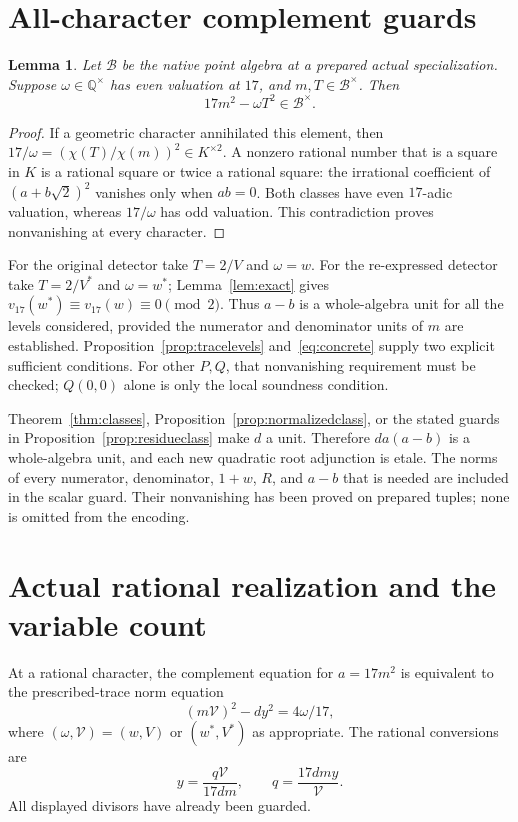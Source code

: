 \documentclass[11pt,a4paper]{article}
\newtheorem{lemma}[theorem]{Lemma}
\theoremstyle{definition}\newtheorem{definition}[theorem]{Definition}
\newcommand{\Q}{\mathbb Q}\newcommand{\Z}{\mathbb Z}
\begin{document}
\section{All-character complement guards}

\begin{lemma}\label{lem:complementguard}
Let $\mathcal B$ be the native point algebra at a prepared actual
specialization. Suppose $\omega\in\Q^\times$ has even valuation
at $17$, and $m,T\in\mathcal B^\times$. Then
\[
                       17m^2-\omega T^2\in\mathcal B^\times.
\]
\end{lemma}
\begin{proof}
If a geometric character annihilated this element, then
$17/\omega=(\chi(T)/\chi(m))^2\in K^{\times2}$.
A nonzero rational number that is a square in $K$ is a rational
square or twice a rational square: the irrational coefficient of
$(a+b\sqrt2)^2$ vanishes only when $ab=0$. Both classes have
even $17$-adic valuation, whereas $17/\omega$ has odd valuation.
This contradiction proves nonvanishing at every character.
\end{proof}

For the original detector take $T=2/V$ and $\omega=w$.
For the re-expressed detector take $T=2/V^*$ and $\omega=w^*$;
Lemma~\ref{lem:exact} gives
$v_{17}(w^*)\equiv v_{17}(w)\equiv0\pmod2$.
Thus $a-b$ is a whole-algebra unit for all the levels considered,
provided the numerator and denominator units of $m$ are established.
Proposition~\ref{prop:tracelevels} and~\eqref{eq:concrete} supply
two explicit sufficient conditions. For other $P,Q$, that
nonvanishing requirement must be checked; $Q(0,0)$ alone is only
the local soundness condition.

Theorem~\ref{thm:classes}, Proposition~\ref{prop:normalizedclass},
or the stated guards in Proposition~\ref{prop:residueclass} make $d$
a unit. Therefore
$d a(a-b)$ is a whole-algebra unit, and each new quadratic root
adjunction is etale. The norms of every numerator, denominator,
$1+w$, $R$, and $a-b$ that is needed are included in the scalar
guard. Their nonvanishing has been proved on prepared tuples;
none is omitted from the encoding.

\section{Actual rational realization and the variable count}

At a rational character, the complement equation for $a=17m^2$
is equivalent to the prescribed-trace norm equation
\begin{equation}\label{eq:actualnorm}
                  (m\mathcal V)^2-dy^2=4\omega/17,
\end{equation}
where $(\omega,\mathcal V)=(w,V)$ or $(w^*,V^*)$ as appropriate.
The rational conversions are
\[
                  y=\frac{q\mathcal V}{17dm},\qquad
                  q=\frac{17dm y}{\mathcal V}.
\]
All displayed divisors have already been guarded.
\end{document}
